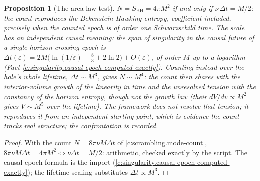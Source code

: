 \documentclass[11pt]{article}
\newtheorem{proposition}[theorem]{Proposition}
\theoremstyle{definition}
\theoremstyle{plain}
\newcommand{\changedmark}[2]{\marginpar{\raggedright\scriptsize\color{#1}#2}}
\providecommand{\SBH}{}\renewcommand{\SBH}{S_{\mathrm{BH}}}
\begin{document}
\begin{proposition}[The area-law test]\label{c:scrambling.area-law-test}
\changedmark{gray}{reworded}
$N = \SBH = 4\pi M^2$ if and only if $\nu\,\Delta t = M/2$: the count reproduces the Bekenstein-Hawking entropy, coefficient included, precisely when the counted epoch is of order one Schwarzschild time. The scale has an independent causal meaning: the span of singularity in the causal future of a single horizon-crossing epoch is $\Delta t(\varepsilon) = 2M\bigl(\ln(1/\varepsilon) - \tfrac83 + 2\ln 2\bigr) + O(\varepsilon)$, of order $M$ up to a logarithm (Fact \ref{c:singularity.causal-epoch-computed-exactly}). Counting instead over the hole's whole lifetime, $\Delta t \sim M^3$, gives $N \sim M^4$: the count then shares with the interior-volume growth of \cite{ChristodoulouRovelli2015} the linearity in time and the unresolved tension with the constancy of the horizon entropy, though not the growth law (their $dV/dv \propto M^2$ gives $V \sim M^5$ over the lifetime). The framework does not resolve that tension; it reproduces it from an independent starting point, which is evidence the count tracks real structure; the confrontation is recorded.
\end{proposition}
\begin{proof}
With the count $N = 8\pi\nu M\Delta t$ of \ref{c:scrambling.mode-count}, $8\pi\nu M\Delta t = 4\pi M^2 \iff \nu\Delta t = M/2$: arithmetic, checked exactly by the script. The causal-epoch formula is the import (\ref{c:singularity.causal-epoch-computed-exactly}); the lifetime scaling substitutes $\Delta t \propto M^3$.

\end{proof}
\end{document}
